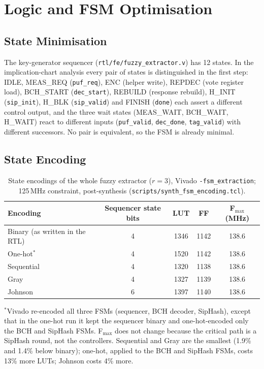 \documentclass[11pt,a4paper]{article}
\begin{document}
\section{Logic and FSM Optimisation}
\label{sec:logic}

\subsection{State Minimisation}
The key-generator sequencer (\texttt{rtl/fe/fuzzy\_extractor.v}) has 12 states. In the implication-chart
analysis every pair of states is distinguished in the first step: IDLE, MEAS\_REQ (\texttt{puf\_req}),
ENC (helper write), REPDEC (vote register load), BCH\_START (\texttt{dec\_start}), REBUILD (response
rebuild), H\_INIT (\texttt{sip\_init}), H\_BLK (\texttt{sip\_valid}) and FINISH (\texttt{done}) each assert
a different control output, and the three wait states (MEAS\_WAIT, BCH\_WAIT, H\_WAIT) react to different
inputs (\texttt{puf\_valid}, \texttt{dec\_done}, \texttt{tag\_valid}) with different successors. No pair is
equivalent, so the FSM is already minimal.

\subsection{State Encoding}
\begin{table}[H]\centering\small
\caption{State encodings of the whole fuzzy extractor ($r=3$), Vivado \texttt{-fsm\_extraction}; 125\,MHz constraint, post-synthesis (\texttt{scripts/synth\_fsm\_encoding.tcl}).}\label{tab:encoding}
\begin{tabular}{@{}lcccc@{}}
\toprule
Encoding & Sequencer state bits & LUT & FF & F$_\text{max}$ (MHz)\\
\midrule
Binary (as written in the RTL) & 4 & 1346 & 1142 & 138.6\\
One-hot$^{*}$ & 4 & 1520 & 1142 & 138.6\\
Sequential & 4 & 1320 & 1138 & 138.6\\
Gray & 4 & 1327 & 1139 & 138.6\\
Johnson & 6 & 1397 & 1140 & 138.6\\
\bottomrule
\end{tabular}
\end{table}
$^{*}$Vivado re-encoded all three FSMs (sequencer, BCH decoder, SipHash), except that in the one-hot run
it kept the sequencer binary and one-hot-encoded only the BCH and SipHash FSMs. F$_\text{max}$ does not change because the critical path is a SipHash round,
not the controllers. Sequential and Gray are the smallest (1.9\% and 1.4\% below binary); one-hot, applied to the BCH and
SipHash FSMs, costs 13\% more LUTs; Johnson costs 4\% more.
\end{document}
